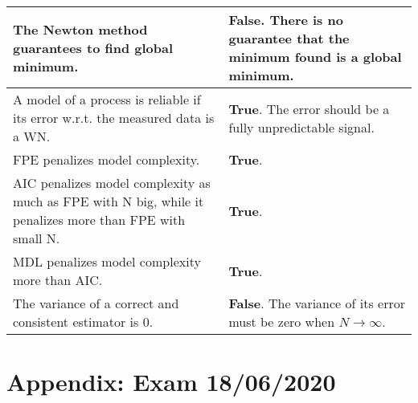 \documentclass[10pt,a4paper]{article}
\begin{document}
\begin{center}
\begin{tabular}{ | m{200pt} | m{200pt}| }
    \\ \hline
    The Newton method guarantees to find global minimum. & \textbf{False}. There is no guarantee that the minimum found is a global minimum. 
    \\ \hline
    A model of a process is reliable if its error w.r.t. the measured data is a WN. & \textbf{True}. The error should be a fully unpredictable signal.
    \\ \hline
    FPE penalizes model complexity. & \textbf{True}.
    \\ \hline
    AIC penalizes model complexity as much as FPE with N big, while it penalizes more than FPE with small N. & \textbf{True}.
    \\ \hline
    MDL penalizes model complexity more than AIC. & \textbf{True}.
    \\ \hline
    The variance of a correct and consistent estimator is 0. & \textbf{False}. The variance of its error must be zero when $N \rightarrow \infty$.
    \\ \hline
\end{tabular}
\end{center}
\pagebreak
\section{Appendix: Exam 18/06/2020}
\end{document}
